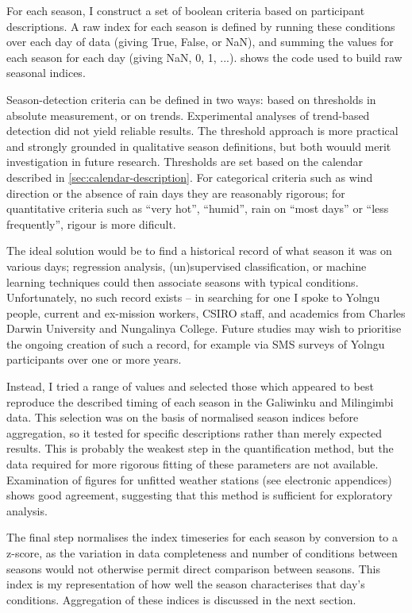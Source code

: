 For each season, I construct a set of boolean criteria based on participant
descriptions.  A raw index for each season is defined by
running these conditions over each day of data (giving True, False, or NaN),
and summing the values for each season for each day (giving NaN, 0, 1, ...).
 shows the code used to build raw
seasonal indices.

Season-detection criteria can be defined in two ways: based on thresholds
in absolute measurement, or on trends.  Experimental analyses of trend-based
detection did not yield reliable results.  The threshold approach is more
practical and strongly grounded in qualitative season definitions, but both
wouuld merit investigation in future research.
%
Thresholds are set based on the calendar described in \cref{sec:calendar-description}.
For categorical criteria such as wind direction or the absence of rain days
they are reasonably rigorous; for quantitative criteria
such as ``very hot'', ``humid'', rain on ``most days'' or ``less frequently'',
rigour is more dificult.

The ideal solution would be to find a historical record of what season
it was on various days; regression analysis, (un)supervised classification,
or machine learning techniques could then associate seasons with typical
conditions.  Unfortunately, no such record exists -- in searching for one
I spoke to Yolngu people, current and ex-mission workers, CSIRO staff,
and academics from Charles Darwin University and Nungalinya College.
Future studies may wish to prioritise the ongoing creation of such a record,
for example via SMS surveys of Yolngu participants over one or more years.

Instead, I tried a range of values and selected those which appeared to
best reproduce the described timing of each season in the Galiwinku and
Milingimbi data.  This selection was on the basis of normalised season
indices before aggregation, so it tested for specific descriptions
rather than merely expected results.
%
This is probably the weakest step in the quantification method, but the data
required for more rigorous fitting of these parameters are not available.
Examination of figures for unfitted weather stations (see electronic appendices)
shows good agreement, suggesting that this method is sufficient for exploratory
analysis.

The final step normalises the index timeseries for each season by conversion to
a z-score, as the variation in data completeness and number of conditions between
seasons would not otherwise permit direct comparison between seasons.
This index is my representation of how well the season characterises that day's
conditions.  Aggregation of these indices is discussed in the next section.



